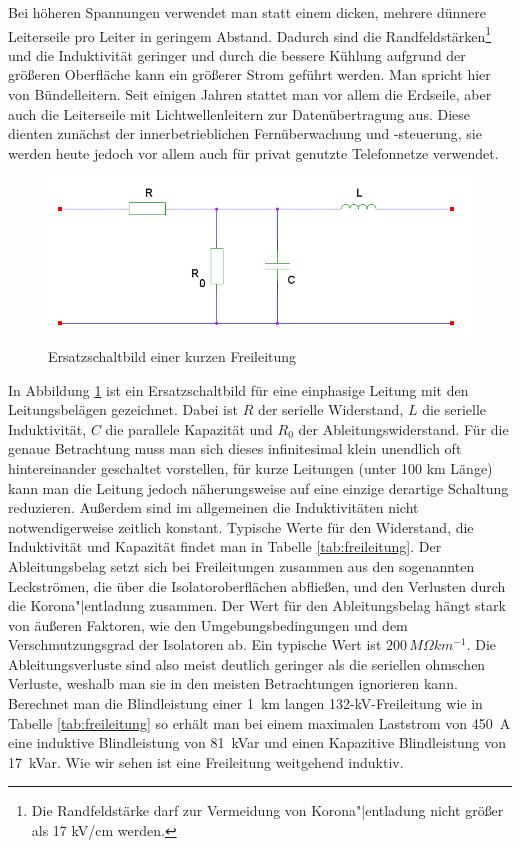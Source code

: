 Bei höheren Spannungen verwendet man statt einem dicken, mehrere dünnere Leiterseile pro Leiter in geringem Abstand. Dadurch sind die Randfeldstärken\footnote{Die Randfeldstärke darf zur Vermeidung von Korona"|entladung nicht größer als 17 kV/cm werden.\cite{Flosdorff}} und die Induktivität geringer und durch die bessere Kühlung aufgrund der größeren Oberfläche kann ein größerer Strom geführt werden. Man spricht hier von Bündelleitern.
Seit einigen Jahren stattet man vor allem die Erdseile, aber auch die Leiterseile mit Lichtwellenleitern zur Datenübertragung aus. Diese dienten zunächst der innerbetrieblichen Fernüberwachung und -steuerung, sie werden heute jedoch vor allem auch für privat genutzte Telefonnetze verwendet.\cite{Flosdorff}

\begin{figure}[tbhn]
\begin{center}
\noindent
\includegraphics[scale=0.5]{freileitung.png}
\end{center}
\caption{Ersatzschaltbild einer kurzen Freileitung}
\label{pic:Ersatzschaltbildfreileitung}
\end{figure}

In Abbildung \ref{pic:Ersatzschaltbildfreileitung} ist ein Ersatzschaltbild für eine einphasige Leitung mit den Leitungsbelägen gezeichnet.
Dabei ist $R$ der serielle Widerstand, $L$ die serielle Induktivität, $C$ die parallele Kapazität und $R_0$ der Ableitungswiderstand. Für die genaue Betrachtung muss man sich dieses infinitesimal klein unendlich oft hintereinander geschaltet vorstellen, für kurze Leitungen (unter 100 km Länge) kann man die Leitung jedoch näherungsweise auf eine einzige derartige Schaltung reduzieren\cite{Harrison}.
Außerdem sind im allgemeinen die Induktivitäten nicht notwendigerweise zeitlich konstant\cite{Flosdorff}.
Typische Werte für den Widerstand, die Induktivität und Kapazität findet man in Tabelle \ref{tab:freileitung}.
Der Ableitungsbelag setzt sich bei Freileitungen zusammen aus den sogenannten Leckströmen, die über die Isolator\-oberflächen abfließen, und den Verlusten durch die Korona"|entladung zusammen.\cite{Heuck}
Der Wert für den Ableitungsbelag hängt stark von äußeren Faktoren, wie den Umgebungsbedingungen und dem Verschmutzungsgrad der Isolatoren ab. Ein typische Wert ist $200\,M\Omega km^{-1}$.\cite{Harrison} Die Ableitungsverluste sind also meist deutlich geringer als die seriellen ohmschen Verluste, weshalb man sie in den meisten Betrachtungen ignorieren kann.
Berechnet man die Blindleistung einer 1\ km langen 132-kV-Freileitung wie in Tabelle \ref{tab:freileitung} so erhält man bei einem maximalen Laststrom von 450\ A eine induktive Blindleistung von 81\ kVar und einen Kapazitive Blindleistung von 17\ kVar. Wie wir sehen ist eine Freileitung weitgehend induktiv.

